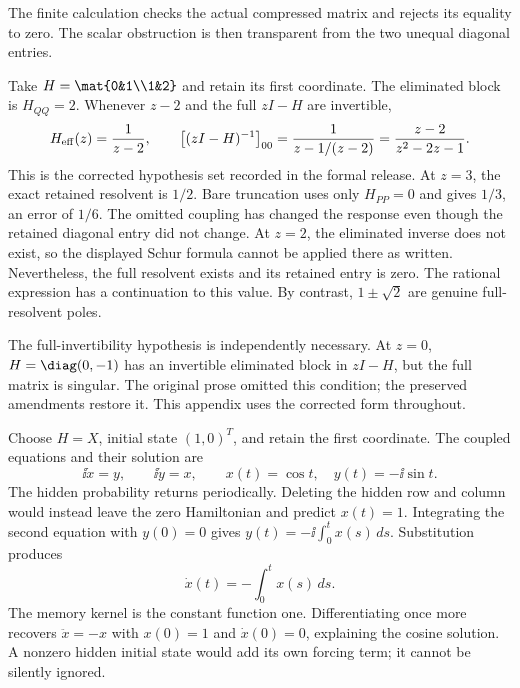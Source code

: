 The finite calculation checks the actual compressed matrix and rejects its equality to zero. The scalar obstruction is then transparent from the two unequal diagonal entries.

Take $H=\mat{0&1\\1&2}$ and retain its first coordinate. The eliminated block is $H_{QQ}=2$. Whenever $z-2$ and the full $zI-H$ are invertible,
\[
H_{\rm eff}(z)=\frac1{z-2},\qquad
\bigl[(zI-H)^{-1}\bigr]_{00}
=\frac1{z-1/(z-2)}=\frac{z-2}{z^2-2z-1}.
\]
This is the corrected hypothesis set recorded in the formal release.
At $z=3$, the exact retained resolvent is $1/2$. Bare truncation uses only $H_{PP}=0$ and gives $1/3$, an error of $1/6$. The omitted coupling has changed the response even though the retained diagonal entry did not change.
At $z=2$, the eliminated inverse does not exist, so the displayed Schur formula cannot be applied there as written. Nevertheless, the full resolvent exists and its retained entry is zero. The rational expression has a continuation to this value. By contrast, $1\pm\sqrt2$ are genuine full-resolvent poles.

The full-invertibility hypothesis is independently necessary. At $z=0$, $H=\diag(0,-1)$ has an invertible eliminated block in $zI-H$, but the full matrix is singular. The original prose omitted this condition; the preserved amendments restore it. This appendix uses the corrected form throughout.

Choose $H=X$, initial state $(1,0)^T$, and retain the first coordinate. The coupled equations and their solution are
\[
\ii\dot x=y,\qquad \ii\dot y=x,\qquad
x(t)=\cos t,\quad y(t)=-\ii\sin t.
\]
The hidden probability returns periodically. Deleting the hidden row and column would instead leave the zero Hamiltonian and predict $x(t)=1$.
Integrating the second equation with $y(0)=0$ gives $y(t)=-\ii\int_0^tx(s)\,ds$. Substitution produces
\[
\dot x(t)=-\int_0^tx(s)\,ds.
\]
The memory kernel is the constant function one. Differentiating once more recovers $\ddot x=-x$ with $x(0)=1$ and $\dot x(0)=0$, explaining the cosine solution. A nonzero hidden initial state would add its own forcing term; it cannot be silently ignored.


